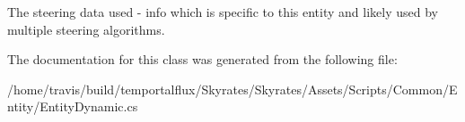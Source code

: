 The steering data used -\/ info which is specific to this entity and likely used by multiple steering algorithms. 



The documentation for this class was generated from the following file\-:\begin{DoxyCompactItemize}
\item 
/home/travis/build/temportalflux/\-Skyrates/\-Skyrates/\-Assets/\-Scripts/\-Common/\-Entity/Entity\-Dynamic.\-cs\end{DoxyCompactItemize}
